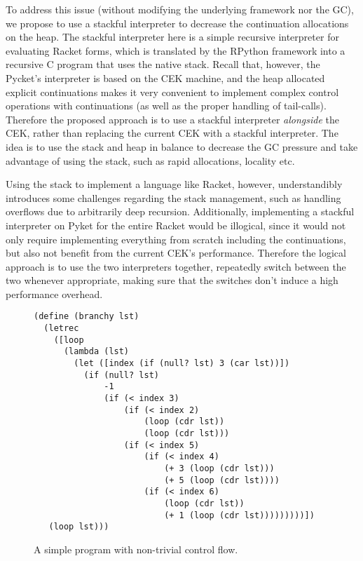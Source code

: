 To address this issue (without modifying the underlying framework nor
the GC), we propose to use a stackful interpreter to decrease the
continuation allocations on the heap. The stackful interpreter here is
a simple recursive interpreter for evaluating Racket forms, which is
translated by the RPython framework into a recursive C program that
uses the native stack. Recall that, however, the Pycket's interpreter
is based on the CEK machine, and the heap allocated explicit
continuations makes it very convenient to implement complex control
operations with continuations (as well as the proper handling of
tail-calls). Therefore the proposed approach is to use a stackful
interpreter \emph{alongside} the CEK, rather than replacing the
current CEK with a stackful interpreter. The idea is to use the stack
and heap in balance to decrease the GC pressure and take advantage of
using the stack, such as rapid allocations, locality etc.

Using the stack to implement a language like Racket, however,
understandibly introduces some challenges regarding the stack
management, such as handling overflows due to arbitrarily deep
recursion. Additionally, implementing a stackful interpreter on Pyket
for the entire Racket would be illogical, since it would not only
require implementing everything from scratch including the
continuations, but also not benefit from the current CEK's
performance. Therefore the logical approach is to use the two
interpreters together, repeatedly switch between the two whenever
appropriate, making sure that the switches don't induce a high
performance overhead.

\begin{wrapfigure}[19]{l}{0.5\textwidth}
  \vspace{-0.5cm}
\small
\begin{lstlisting}[mathescape]
(define (branchy lst)
  (letrec
    ([loop
      (lambda (lst)
        (let ([index (if (null? lst) 3 (car lst))])
          (if (null? lst)
              -1
              (if (< index 3)
                  (if (< index 2)
                      (loop (cdr lst))
                      (loop (cdr lst)))
                  (if (< index 5)
                      (if (< index 4)
                          (+ 3 (loop (cdr lst)))
                          (+ 5 (loop (cdr lst))))
                      (if (< index 6)
                          (loop (cdr lst))
                          (+ 1 (loop (cdr lst)))))))))])
   (loop lst)))
\end{lstlisting}
\caption{A simple program with non-trivial control flow.}
\label{fig:branchy}
\end{wrapfigure}

